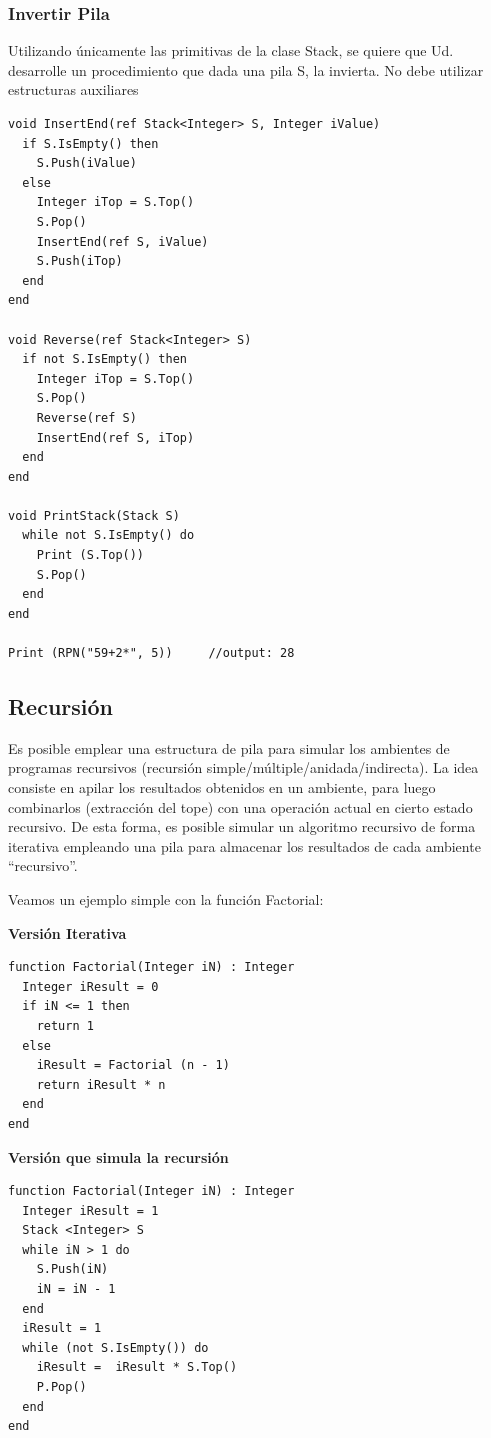\subsubsection{Invertir Pila}

Utilizando únicamente las primitivas de la clase Stack, se quiere que Ud. desarrolle un procedimiento que dada una pila S, la invierta. No debe utilizar estructuras auxiliares


\begin{lstlisting}[upquote=true, language=pseudo]
void InsertEnd(ref Stack<Integer> S, Integer iValue)
  if S.IsEmpty() then
    S.Push(iValue)
  else
    Integer iTop = S.Top()
    S.Pop()
    InsertEnd(ref S, iValue)
    S.Push(iTop)
  end
end

void Reverse(ref Stack<Integer> S)
  if not S.IsEmpty() then
    Integer iTop = S.Top()
    S.Pop()
    Reverse(ref S)
    InsertEnd(ref S, iTop)
  end
end

void PrintStack(Stack S)
  while not S.IsEmpty() do
    Print (S.Top())
    S.Pop()
  end
end

Print (RPN("59+2*", 5))		//output: 28
\end{lstlisting}

\subsection{Recursión} \label{sec:recstack}

Es posible emplear una estructura de pila para simular los ambientes de programas recursivos (recursión simple/múltiple/anidada/indirecta). La idea consiste en apilar los resultados obtenidos en un ambiente, para luego combinarlos (extracción del tope) con una operación actual en cierto estado recursivo. De esta forma, es posible simular un algoritmo recursivo de forma iterativa empleando una pila para almacenar los resultados de cada ambiente “recursivo”.

Veamos un ejemplo simple con la función Factorial:

\textbf{Versión Iterativa}
\begin{lstlisting}[upquote=true, language=pseudo]
function Factorial(Integer iN) : Integer
  Integer iResult = 0
  if iN <= 1 then
    return 1
  else
    iResult = Factorial (n - 1)
    return iResult * n
  end
end
\end{lstlisting}

\textbf{Versión que simula la recursión}
\begin{lstlisting}[upquote=true, language=pseudo]
function Factorial(Integer iN) : Integer
  Integer iResult = 1
  Stack <Integer> S
  while iN > 1 do
    S.Push(iN)
    iN = iN - 1
  end
  iResult = 1
  while (not S.IsEmpty()) do
    iResult =  iResult * S.Top()
    P.Pop()
  end
end
\end{lstlisting}

